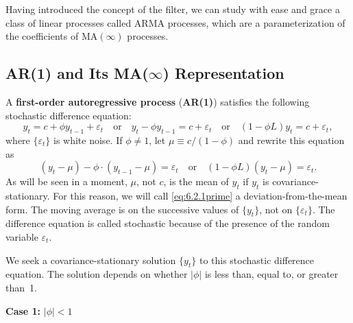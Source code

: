 
Having introduced the concept of the filter, we can study with ease and grace a class
of linear processes called ARMA processes, which are a parameterization of the
coefficients of $\text{MA}(\infty)$ processes.

\subsection*{AR(1) and Its MA($\infty$) Representation}

A \textbf{first-order autoregressive process} (\textbf{AR(1)}) satisfies the following stochastic
difference equation:
\begin{equation}
  y_t = c + \phi y_{t-1} + \varepsilon_t \quad \text{or} \quad
  y_t - \phi y_{t-1} = c + \varepsilon_t \quad \text{or} \quad
  (1 - \phi L) y_t = c + \varepsilon_t,
  \label{eq:6.2.1}
\end{equation}
where $\{\varepsilon_t\}$ is white noise. If $\phi \neq 1$, let $\mu \equiv c/(1 - \phi)$ and rewrite this equation as
\begin{equation}
  (y_t - \mu) - \phi \cdot (y_{t-1} - \mu) = \varepsilon_t \quad \text{or} \quad
  (1 - \phi L)(y_t - \mu) = \varepsilon_t.
  \label{eq:6.2.1prime}
  \tag{6.2.1$'$}
\end{equation}
As will be seen in a moment, $\mu$, not $c$, is the mean of $y_t$ if $y_t$ is covariance-stationary.
For this reason, we will call \eqref{eq:6.2.1prime} a deviation-from-the-mean form.
The moving average is on the successive values of $\{y_t\}$, not on $\{\varepsilon_t\}$. The difference
equation is called stochastic because of the presence of the random variable $\varepsilon_t$.

We seek a covariance-stationary solution $\{y_t\}$ to this stochastic difference equation.
The solution depends on whether $|\phi|$ is less than, equal to, or greater than~1.

\medskip
\noindent\textbf{Case 1:} $|\phi| < 1$

